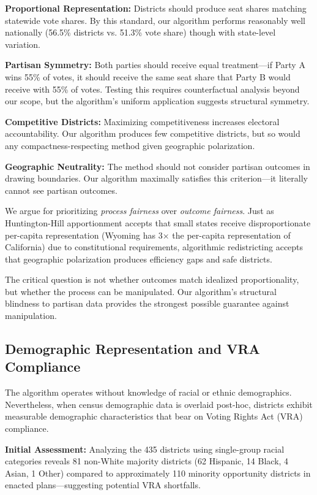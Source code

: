\textbf{Proportional Representation:} Districts should produce seat shares matching statewide vote shares. By this standard, our algorithm performs reasonably well nationally (56.5\% districts vs. 51.3\% vote share) though with state-level variation.

\textbf{Partisan Symmetry:} Both parties should receive equal treatment—if Party A wins 55\% of votes, it should receive the same seat share that Party B would receive with 55\% of votes. Testing this requires counterfactual analysis beyond our scope, but the algorithm's uniform application suggests structural symmetry.

\textbf{Competitive Districts:} Maximizing competitiveness increases electoral accountability. Our algorithm produces few competitive districts, but so would any compactness-respecting method given geographic polarization.

\textbf{Geographic Neutrality:} The method should not consider partisan outcomes in drawing boundaries. Our algorithm maximally satisfies this criterion—it literally cannot see partisan outcomes.

We argue for prioritizing \textit{process fairness} over \textit{outcome fairness}. Just as Huntington-Hill apportionment accepts that small states receive disproportionate per-capita representation (Wyoming has 3× the per-capita representation of California) due to constitutional requirements, algorithmic redistricting accepts that geographic polarization produces efficiency gaps and safe districts.

The critical question is not whether outcomes match idealized proportionality, but whether the process can be manipulated. Our algorithm's structural blindness to partisan data provides the strongest possible guarantee against manipulation.

\subsection{Demographic Representation and VRA Compliance}

The algorithm operates without knowledge of racial or ethnic demographics. Nevertheless, when census demographic data is overlaid post-hoc, districts exhibit measurable demographic characteristics that bear on Voting Rights Act (VRA) compliance.

\textbf{Initial Assessment:} Analyzing the 435 districts using single-group racial categories reveals 81 non-White majority districts (62 Hispanic, 14 Black, 4 Asian, 1 Other) compared to approximately 110 minority opportunity districts in enacted plans—suggesting potential VRA shortfalls.


